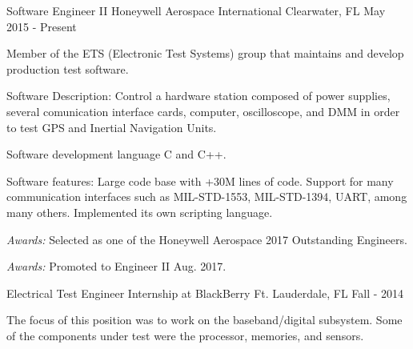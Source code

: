 

\begin{cventries}

  \cventry
    {Software Engineer II} %
    {Honeywell Aerospace International} %
    {Clearwater, FL} %
    {May 2015 - Present} %
    {
      \begin{cvitems} %
				\item {Member of the ETS (Electronic Test Systems) group that maintains and develop production test software.}
				\item {Software Description: Control a hardware station composed of power supplies, several comunication
					interface cards, computer, oscilloscope, and DMM in order to test GPS and Inertial Navigation Units.}
				\item {Software development language C and C++.}
				\item {Software features: Large code base with +30M lines of code. Support for many communication interfaces such as MIL-STD-1553, MIL-STD-1394, UART, among many
				others. Implemented its own scripting language.}
				\item {{\it Awards:} Selected as one of the Honeywell Aerospace 2017 Outstanding Engineers.}
				\item {{\it Awards:} Promoted to Engineer II Aug. 2017.}
      \end{cvitems}
    }

	\cventry
		{Electrical Test Engineer} %
		{Internship at BlackBerry} %
		{Ft. Lauderdale, FL} %
		{Fall - 2014} %
		{
			\begin{cvitems} %
			\item {The focus of this position was to work on the baseband/digital subsystem. Some of the 
				components under test were the processor, memories, and sensors.}
			\end{cvitems}
		}

\end{cventries}
